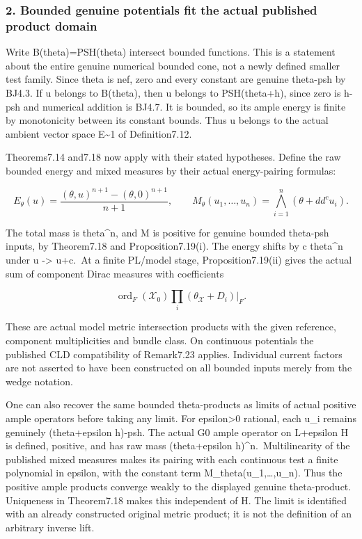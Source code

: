 \documentclass[
]{article}
\begin{document}
\subsubsection{2. Bounded genuine potentials fit the actual published
product
domain}\label{bounded-genuine-potentials-fit-the-actual-published-product-domain}

Write B(theta)=PSH(theta) intersect bounded functions. This is a
statement about the entire genuine numerical bounded cone, not a newly
defined smaller test family. Since theta is nef, zero and every constant
are genuine theta-psh by BJ4.3. If u belongs to B(theta), then u belongs
to PSH(theta+h), since zero is h-psh and numerical addition is BJ4.7. It
is bounded, so its ample energy is finite by monotonicity between its
constant bounds. Thus u belongs to the actual ambient vector space
E\textasciitilde1 of Definition7.12.

Theorems7.14 and7.18 now apply with their stated hypotheses. Define the
raw bounded energy and mixed measures by their actual energy-pairing
formulas:

\[E_\theta(u)=\frac{(\theta,u)^{n+1}-(\theta,0)^{n+1}}{n+1},\qquad
M_\theta(u_1,\ldots,u_n)=\bigwedge_{i=1}^n(\theta+dd^cu_i).\]

The total mass is theta\^{}n, and M is positive for genuine bounded
theta-psh inputs, by Theorem7.18 and Proposition7.19(i). The energy
shifts by c theta\^{}n under u -\textgreater{} u+c.~At a finite PL/model
stage, Proposition7.19(ii) gives the actual sum of component Dirac
measures with coefficients

\[\operatorname{ord}_F(\mathcal X_0)\prod_i(\theta_{\mathcal X}+D_i)|_F.\]

These are actual model metric intersection products with the given
reference, component multiplicities and bundle class. On continuous
potentials the published CLD compatibility of Remark7.23 applies.
Individual current factors are not asserted to have been constructed on
all bounded inputs merely from the wedge notation.

One can also recover the same bounded theta-products as limits of actual
positive ample operators before taking any limit. For
epsilon\textgreater0 rational, each u\_i remains genuinely
(theta+epsilon h)-psh. The actual G0 ample operator on L+epsilon H is
defined, positive, and has raw mass (theta+epsilon
h)\^{}n.~Multilinearity of the published mixed measures makes its
pairing with each continuous test a finite polynomial in epsilon, with
the constant term M\_theta(u\_1,\ldots,u\_n). Thus the positive ample
products converge weakly to the displayed genuine theta-product.
Uniqueness in Theorem7.18 makes this independent of H. The limit is
identified with an already constructed original metric product; it is
not the definition of an arbitrary inverse lift.
\end{document}
